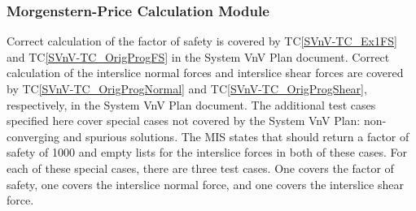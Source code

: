 \documentclass[12pt, titlepage]{article}
\newcommand{\tcref}[1]{TC\ref{#1}}
\begin{document}
\subsubsection{Morgenstern-Price Calculation Module}
Correct calculation of the factor of safety is covered by \tcref{SVnV-TC_Ex1FS} 
and \tcref{SVnV-TC_OrigProgFS} in the System VnV Plan document. Correct 
calculation of the interslice normal forces and interslice shear forces are 
covered by \tcref{SVnV-TC_OrigProgNormal} and \tcref{SVnV-TC_OrigProgShear}, 
respectively, in the System VnV Plan document. The additional test cases 
specified here cover special cases not covered by the System VnV Plan: 
non-converging and spurious solutions. The MIS states that \progname{} should 
return a factor of safety of 1000 and empty lists for the interslice forces in 
both of these cases. For each of these special cases, there are three test 
cases. One covers the factor of safety, one covers the interslice normal force, 
and one covers the interslice shear force.
\end{document}
